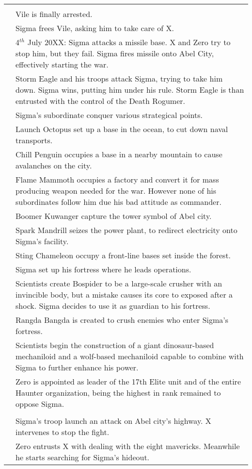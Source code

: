 \begin{tabularx}{\linewidth}{l X}
	\midrule
	\rowcolor{Aquamarine}
	\multicolumn{2}{c}{\textbf{Day of $\Sigma$ and beginning of the war}}\\
	\addlinespace[1.5ex]
	\tabdot& Vile is finally arrested.\\
	\tabdot& Sigma frees Vile, asking him to take care of X.\\
	\tabdot& 4$^{th}$ July 20XX: Sigma attacks a missile base. X and Zero try to stop him, but they fail. Sigma fires missile onto Abel City, effectively starting the war.\\
	\tabdot& Storm Eagle and his troops attack Sigma, trying to take him down. Sigma wins, putting him under his rule. Storm Eagle is than entrusted with the control of the Death Rogumer.\\
	\tabdot& Sigma's subordinate conquer various strategical points.\\
	\tabline& Launch Octopus set up a base in the ocean, to cut down naval transports.\\
	\tabline& Chill Penguin occupies a base in a nearby mountain to cause avalanches on the city.\\
	\tabline& Flame Mammoth occupies a factory and convert it for mass producing weapon needed for the war. However none of his subordinates follow him due his bad attitude as commander.\\
	\tabline& Boomer Kuwanger capture the tower symbol of Abel city.\\
	\tabline& Spark Mandrill seizes the power plant, to redirect electricity onto Sigma's facility.\\
	\tabline& Sting Chameleon occupy a front-line bases set inside the forest.\\
	\tabdot& Sigma set up his fortress where he leads operations.\\
	\tabline& Scientists create Bospider to be a large-scale crusher with an invincible body, but a mistake causes its core to exposed after a shock. Sigma decides to use it as guardian to his fortress.\\
	\tabline& Rangda Bangda is created to crush enemies who enter Sigma's fortress.\\
	\tabline& Scientists begin the construction of a giant dinosaur-based mechaniloid and a wolf-based mechaniloid capable to combine with Sigma to further enhance his power.\\
	\tabdot& Zero is appointed as leader of the 17th Elite unit and of the entire Haunter organization, being the highest in rank remained to oppose Sigma.\\
	\midrule
	\rowcolor{Aquamarine}
	\multicolumn{2}{c}{\textbf{Mega Man X}}\\
	\addlinespace[1.5ex]
	\tabdot& Sigma's troop launch an attack on Abel city's highway. X intervenes to stop the fight.\\
	\tabdot& Zero entrusts X with dealing with the eight mavericks. Meanwhile he starts searching for Sigma's hideout.\\
	 
		
\end{tabularx}